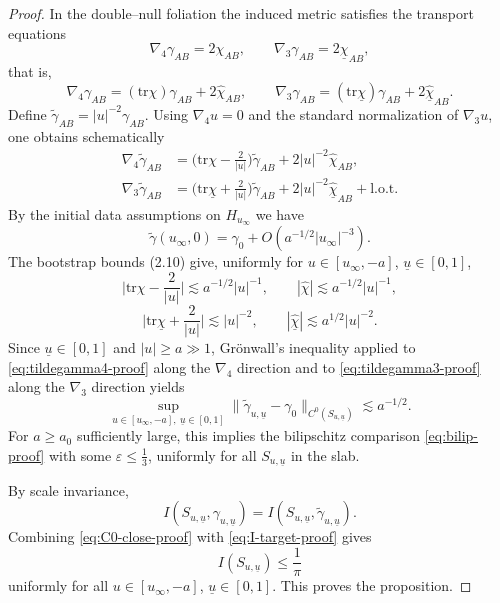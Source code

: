 \documentclass{amsart}
\newcommand{\ubar}{\underline{u}}
\newcommand{\tr}{\mbox{tr}}
\begin{document}
{\begin{proof}
\medskip
\noindent
In the double–null foliation the induced metric satisfies the transport equations
\[
\nabla_{4}\gamma_{AB}=2\chi_{AB},
\qquad
\nabla_{3}\gamma_{AB}=2\underline{\chi}_{AB},
\]
that is,
\[
\nabla_{4}\gamma_{AB}=(\tr\chi)\gamma_{AB}+2\hat\chi_{AB},
\qquad
\nabla_{3}\gamma_{AB}=(\tr\underline{\chi})\gamma_{AB}+2\underline{\hat\chi}_{AB}.
\]
Define $\tilde\gamma_{AB}=|u|^{-2}\gamma_{AB}$. Using $\nabla_{4}u=0$ and the standard normalization of $\nabla_{3}u$, one obtains schematically
\begin{align}
\nabla_{4}\tilde\gamma_{AB}
&=
\Big(\tr\chi-\frac{2}{|u|}\Big)\tilde\gamma_{AB}
+2|u|^{-2}\hat\chi_{AB},
\label{eq:tildegamma4-proof}
\\
\nabla_{3}\tilde\gamma_{AB}
&=
\Big(\tr\underline{\chi}+\frac{2}{|u|}\Big)\tilde\gamma_{AB}
+2|u|^{-2}\underline{\hat\chi}_{AB}
+\text{l.o.t.}
\label{eq:tildegamma3-proof}
\end{align}
By the initial data assumptions on $H_{u_\infty}$ we have
\[
\tilde\gamma(u_\infty,0)=\gamma_{0}+O(a^{-1/2}|u_\infty|^{-3}).
\]
The bootstrap bounds (2.10) give, uniformly for $u\in[u_\infty,-a]$, $\ubar\in[0,1]$,
\[
\Big|\tr\chi-\frac{2}{|u|}\Big|\lesssim a^{-1/2}|u|^{-1},
\qquad
|\hat\chi|\lesssim a^{-1/2}|u|^{-1},
\]
\[
\Big|\tr\underline{\chi}+\frac{2}{|u|}\Big|\lesssim |u|^{-2},
\qquad
|\underline{\hat\chi}|\lesssim a^{1/2}|u|^{-2}.
\]
Since $\ubar\in[0,1]$ and $|u|\ge a\gg1$, Grönwall’s inequality applied to
\eqref{eq:tildegamma4-proof} along the $\nabla_{4}$ direction and to
\eqref{eq:tildegamma3-proof} along the $\nabla_{3}$ direction yields
\begin{equation}\label{eq:C0-close-proof}
\sup_{u\in[u_\infty,-a],\ \ubar\in[0,1]}
\|\tilde\gamma_{u,\ubar}-\gamma_{0}\|_{C^{0}(S_{u,\ubar})}
\lesssim a^{-1/2}.
\end{equation}
For $a\ge a_{0}$ sufficiently large, this implies the bilipschitz comparison
\eqref{eq:bilip-proof} with some $\varepsilon\le \frac13$, uniformly for all
$S_{u,\ubar}$ in the slab.

\medskip
\noindent
By scale invariance,
\[
I(S_{u,\ubar},\gamma_{u,\ubar})
=
I(S_{u,\ubar},\tilde\gamma_{u,\ubar}).
\]
Combining \eqref{eq:C0-close-proof} with \eqref{eq:I-target-proof} gives
\[
I(S_{u,\ubar})\le \frac{1}{\pi}
\]
uniformly for all $u\in[u_\infty,-a]$, $\ubar\in[0,1]$. This proves the proposition.
\end{proof}



}
\end{document}
